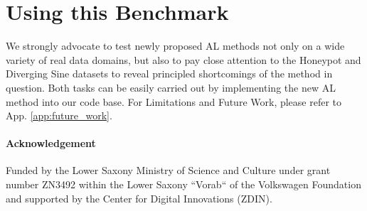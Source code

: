 \documentclass[]{article}
\begin{document}
\section{Using this Benchmark}
We strongly advocate to test newly proposed AL methods not only on a wide variety of real data domains, but also to pay close attention to the Honeypot and Diverging Sine datasets to reveal principled shortcomings of the method in question.
Both tasks can be easily carried out by implementing the new AL method into our code base.
For Limitations and Future Work, please refer to App. \ref{app:future_work}.


\paragraph{Acknowledgement}
Funded by the Lower Saxony Ministry of Science and Culture under grant number ZN3492 within the Lower Saxony “Vorab“ of the Volkswagen Foundation and supported by the Center for Digital Innovations (ZDIN).




%
 

\newpage
\end{document}
